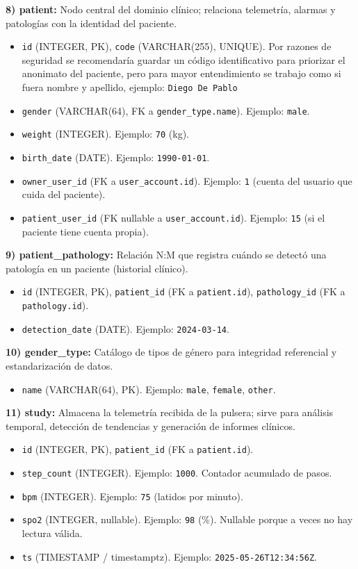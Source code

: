 \documentclass[12pt, a4paper]{article}
\begin{document}
\textbf{8) patient:} Nodo central del dominio clínico; relaciona telemetría, alarmas y patologías con la identidad del paciente.
\begin{itemize}
	\item \texttt{id} (INTEGER, PK), \texttt{code} (VARCHAR(255), UNIQUE). Por razones de seguridad se recomendaría guardar un código identificativo para priorizar el anonimato del paciente, pero para mayor entendimiento se trabajo como si fuera nombre y apellido, ejemplo: \texttt{Diego De Pablo}
	\item \texttt{gender} (VARCHAR(64), FK a \texttt{gender\_type.name}). Ejemplo: \texttt{male}.
	\item \texttt{weight} (INTEGER). Ejemplo: \texttt{70} (kg).
	\item \texttt{birth\_date} (DATE). Ejemplo: \texttt{1990-01-01}.
	\item \texttt{owner\_user\_id} (FK a \texttt{user\_account.id}). Ejemplo: \texttt{1} (cuenta del usuario que cuida del paciente).
	\item \texttt{patient\_user\_id} (FK nullable a \texttt{user\_account.id}). Ejemplo: \texttt{15} (si el paciente tiene cuenta propia).
\end{itemize}



\textbf{9) patient\_pathology:} Relación N:M que registra cuándo se detectó una patología en un paciente (historial clínico).
\begin{itemize}
	\item \texttt{id} (INTEGER, PK), \texttt{patient\_id} (FK a \texttt{patient.id}), \texttt{pathology\_id} (FK a \texttt{pathology.id}).
	\item \texttt{detection\_date} (DATE). Ejemplo: \texttt{2024-03-14}.
\end{itemize}


\textbf{10) gender\_type:} Catálogo de tipos de género para integridad referencial y estandarización de datos.
\begin{itemize}
	\item \texttt{name} (VARCHAR(64), PK). Ejemplo: \texttt{male}, \texttt{female}, \texttt{other}.
\end{itemize}


\textbf{11) study:} Almacena la telemetría recibida de la pulsera; sirve para análisis temporal, detección de tendencias y generación de informes clínicos.
\begin{itemize}
	\item \texttt{id} (INTEGER, PK), \texttt{patient\_id} (FK a \texttt{patient.id}).
	\item \texttt{step\_count} (INTEGER). Ejemplo: \texttt{1000}. Contador acumulado de pasos.
	\item \texttt{bpm} (INTEGER). Ejemplo: \texttt{75} (latidos por minuto).
	\item \texttt{spo2} (INTEGER, nullable). Ejemplo: \texttt{98} (\%). Nullable porque a veces no hay lectura válida.
	\item \texttt{ts} (TIMESTAMP / timestamptz). Ejemplo: \texttt{2025-05-26T12:34:56Z}.
\end{itemize}
\end{document}
